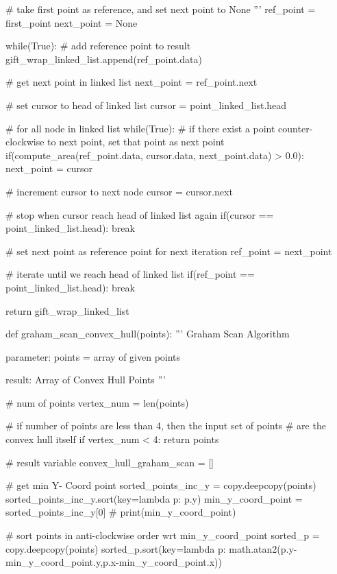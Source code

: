 \documentclass[a4paper,12pt]{article}
\begin{document}
\begin{spacing}{1}
\begin{footnotesize}
\begin{spverbatim}
    # take first point as reference, and set next point to None '''
    ref_point = first_point
    next_point = None

    while(True):
        # add reference point to result
        gift_wrap_linked_list.append(ref_point.data)

        # get next point in linked list
        next_point = ref_point.next

        # set cursor to head of linked list
        cursor = point_linked_list.head

        # for all node in linked list
        while(True):
            # if there exist a point counter-clockwise to next point, set that point as next point
            if(compute_area(ref_point.data, cursor.data, next_point.data) > 0.0):
                next_point = cursor

            # increment cursor to next node
            cursor = cursor.next

            # stop when cursor reach head of linked list again
            if(cursor == point_linked_list.head):
                break

        # set next point as reference point for next iteration
        ref_point = next_point

        # iterate until we reach head of linked list
        if(ref_point == point_linked_list.head):
            break

    return gift_wrap_linked_list

def graham_scan_convex_hull(points):
    ''' Graham Scan Algorithm

        parameter: points = array of given points

        result: Array of Convex Hull Points
    '''

    # num of points
    vertex_num = len(points)

    # if number of points are less than 4, then the input set of points
    # are the convex hull itself
    if vertex_num < 4:
        return points

    # result variable
    convex_hull_graham_scan = []

    # get min Y- Coord point
    sorted_points_inc_y = copy.deepcopy(points)
    sorted_points_inc_y.sort(key=lambda p: p.y)
    min_y_coord_point = sorted_points_inc_y[0]
    # print(min_y_coord_point)

    # sort points in anti-clockwise order wrt min_y_coord_point
    sorted_p = copy.deepcopy(points)
    sorted_p.sort(key=lambda p: math.atan2(p.y-min_y_coord_point.y,p.x-min_y_coord_point.x))


\end{spverbatim}
\end{footnotesize}
\end{spacing}
\end{document}
